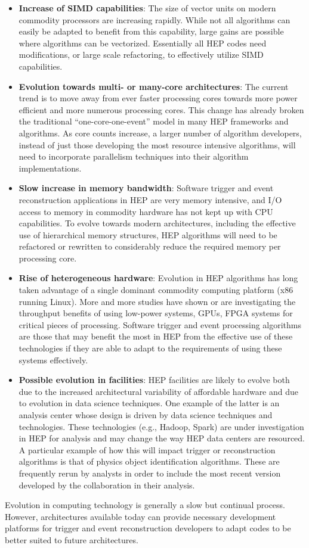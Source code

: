 \begin{itemize}
\item
{\bf Increase of SIMD capabilities}: The size of vector units on modern commodity processors are increasing rapidly. While not all algorithms can easily be adapted to benefit from this capability, large gains are possible where algorithms can be vectorized. Essentially all HEP codes need modifications, or large scale refactoring, to effectively utilize SIMD capabilities.
\item
{\bf Evolution towards multi- or many-core architectures}: The current trend is to move away from ever faster processing cores towards more power efficient and more numerous processing cores. This change has already broken the traditional “one-core-one-event” model in many HEP frameworks and algorithms. As core counts increase, a larger number of algorithm developers, instead of just those developing the most resource intensive algorithms, will need to incorporate parallelism techniques into their algorithm implementations.   
\item
{\bf Slow increase in memory bandwidth}: Software trigger and event reconstruction applications in HEP are very memory intensive, and I/O access to memory in commodity hardware has not kept up with CPU capabilities. To evolve towards modern architectures, including the effective use of hierarchical memory structures, HEP algorithms will need to be refactored or rewritten to considerably reduce the required memory per processing core. 
\item
{\bf Rise of heterogeneous hardware}: Evolution in HEP algorithms has long taken advantage of a single dominant commodity computing platform (x86 running Linux).  More and more studies have shown or are investigating the throughput benefits of using low-power systems, GPUs, FPGA systems for critical pieces of processing. Software trigger and event processing algorithms are those that may benefit the most in HEP from the effective use of these technologies if they are able to adapt to the requirements of using these systems effectively.
\item
{\bf Possible evolution in facilities}: HEP facilities are likely to evolve both due to the increased architectural variability of affordable hardware and due to evolution in data science techniques. One example of the latter is an analysis center whose design is driven by data science techniques and technologies. These technologies (e.g., Hadoop, Spark) are under investigation in HEP for analysis and may change the way HEP data centers are resourced. A particular example of how this will impact trigger or reconstruction algorithms is that of physics object identification algorithms. These are frequently rerun by analysts in order to include the most recent version developed by the collaboration in their analysis.
\end{itemize}
Evolution in computing technology is generally a slow but continual process. However, architectures available today can provide necessary development platforms for trigger and event reconstruction developers to adapt codes to be better suited to future architectures.

